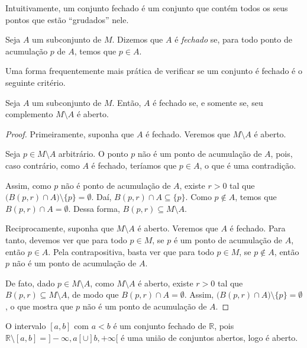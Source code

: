 Intuitivamente, um conjunto fechado é um conjunto que contém todos os seus pontos que estão ``grudados'' nele.

\begin{definition}
    Seja $A$ um subconjunto de $M$.
    Dizemos que $A$ é \emph{fechado} se, para todo ponto de acumulação $p$ de $A$, temos que $p \in A$.
\end{definition}

Uma forma frequentemente mais prática de verificar se um conjunto é fechado é o seguinte critério.
\begin{proposition}
    Seja $A$ um subconjunto de $M$.
    Então, $A$ é fechado se, e somente se, seu complemento $M\setminus A$ é aberto.
\end{proposition}

\begin{proof}
    Primeiramente, suponha que $A$ é fechado.
    Veremos que $M\setminus A$ é aberto.

    Seja $p \in M\setminus A$ arbitrário.
    O ponto $p$ não é um ponto de acumulação de $A$, pois, caso contrário, como $A$ é fechado, teríamos que $p \in A$, o que é uma contradição.

    Assim, como $p$ não é ponto de acumulação de $A$, existe $r>0$ tal que $\bigl(B(p, r)\cap A\bigr)\setminus\{p\} = \emptyset$.
    Daí, $B(p, r)\cap A\subseteq \{p\}$.
    Como $p \notin A$, temos que $B(p, r)\cap A = \emptyset$.
    Dessa forma, $B(p, r)\subseteq M\setminus A$.

    Reciprocamente, suponha que $M\setminus A$ é aberto.
    Veremos que $A$ é fechado.
    Para tanto, devemos ver que para todo $p\in M$, se $p$ é um ponto de acumulação de $A$, então $p \in A$.
    Pela contrapositiva, basta ver que para todo $p\in M$, se $p \notin A$, então $p$ não é um ponto de acumulação de $A$.

    De fato, dado $p \in M\setminus A$, como $M\setminus A$ é aberto, existe $r>0$ tal que $B(p, r)\subseteq M\setminus A$, de modo que $B(p, r)\cap A = \emptyset$.
    Assim, $\bigl(B(p, r)\cap A\bigr)\setminus\{p\} = \emptyset$, o que mostra que $p$ não é um ponto de acumulação de $A$.
\end{proof}

\begin{example}
    O intervalo $[a, b]$ com $a<b$ é um conjunto fechado de $\mathbb R$, pois $\mathbb R\setminus [a, b] = ]-\infty, a[ \cup ]b, +\infty[$ é uma união de conjuntos abertos, logo é aberto.
\end{example}

